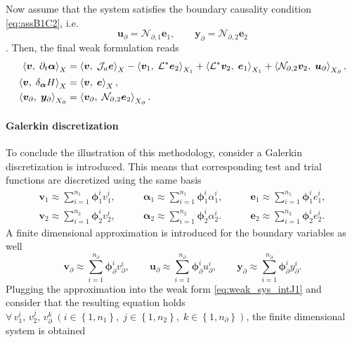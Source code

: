 Now assume that the system satisfies the boundary causality condition \eqref{eq:assB1C2}, i.e.  
\begin{equation*}
\bm{u}_\partial=\mathcal{N}_{\partial, 1} \bm{e}_1, \qquad \bm{y}_\partial=\mathcal{N}_{\partial, 2} \bm{e}_2
\end{equation*}. 
Then, the final weak formulation reads
\begin{equation}\label{eq:weak_sys_intJ2}
\begin{aligned}
\inner[X]{\bm{v}}{\partial_t \bm{\alpha}} &=  \inner[X]{\bm{v}}{\mathcal{J}_a\bm{e}} -\inner[X_1]{\bm{v}_1}{\mathcal{L}^*\bm{e}_2} + \inner[X_1]{\mathcal{L}^*\bm{v}_2}{\bm{e}_1} + \inner[X_\partial]{\mathcal{N}_{\partial, 2} \bm{v}_2}{\bm{u}_{\partial}}, \\
\inner[X]{\bm{v}}{\delta_{\bm{\alpha}} H} &= \inner[X]{\bm{v}}{\bm{e}}, \\
\inner[X_\partial]{\bm{v}_\partial}{\bm{y}_\partial} &= \inner[X_\partial]{\bm{v}_\partial}{\mathcal{N}_{\partial, 2}\bm{e}_2}.
\end{aligned}
\end{equation}

\paragraph{Galerkin discretization}
To conclude the illustration of this methodology, consider a Galerkin discretization is introduced. This means that corresponding test and trial functions are discretized using the same basis
\begin{equation}\label{eq:approx_ve}
\begin{aligned}
\bm{v}_1 \approx \sum_{i=1}^{n_1} \bm{\phi}_1^i v_1^i, \\
\bm{v}_2 \approx \sum_{i=1}^{n_2} \bm{\phi}_2^i v_2^i, 
\end{aligned} \qquad 
\begin{aligned}
\bm{\alpha}_1 \approx \sum_{i=1}^{n_1} \bm{\phi}_1^i \alpha_1^i, \\
\bm{\alpha}_2 \approx \sum_{i=1}^{n_2} \bm{\phi}_2^i \alpha_2^i. 
\end{aligned} \qquad 
\begin{aligned}
\bm{e}_1 \approx \sum_{i=1}^{n_1} \bm{\phi}_1^i e_1^i, \\
\bm{e}_2 \approx \sum_{i=1}^{n_2} \bm{\phi}_2^i e_2^i. 
\end{aligned}
\end{equation}
A finite dimensional approximation is introduced for the boundary variables as well
\begin{equation}\label{eq:approx_boundar}
\bm{v}_\partial \approx \sum_{i=1}^{n_\partial} \bm{\phi}_\partial^i v_\partial^i, \qquad
\bm{u}_\partial \approx \sum_{i=1}^{n_\partial} \bm{\phi}_\partial^i u_\partial^i, \qquad
\bm{y}_\partial \approx \sum_{i=1}^{n_\partial} \bm{\phi}_\partial^i y_\partial^i.
\end{equation}
Plugging the approximation into the weak form \eqref{eq:weak_sys_intJ1} and consider that the resulting equation holds $\forall \, v_1^i,\, v_2^j,\, v_\partial^k \; (i\in\left\{1,n_1\right\}, \; j\in\left\{1,n_2\right\}, \; k\in\left\{1,n_\partial\right\})$, the finite dimensional system is obtained

